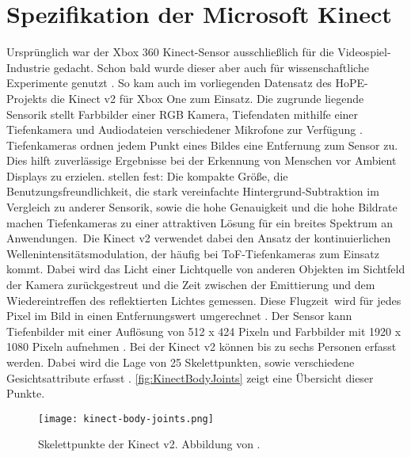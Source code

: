 \section{Spezifikation der Microsoft Kinect}
\label{2-SpezifikationKinect}
Ursprünglich war der Xbox 360 Kinect-Sensor ausschließlich für die Videospiel-Industrie gedacht.
Schon bald wurde dieser aber auch für wissenschaftliche Experimente genutzt \citep{tolgyessy_evaluation_2021}.
So kam auch im vorliegenden Datensatz des HoPE-Projekts die Kinect v2 für Xbox One zum Einsatz.
Die zugrunde liegende Sensorik stellt Farbbilder einer \ac{RGB} Kamera, Tiefendaten mithilfe einer Tiefenkamera
und Audiodateien verschiedener Mikrofone zur Verfügung \citep{windows-developer-center_microsoft_corporation_human_2014}.
Tiefenkameras ordnen jedem Punkt eines Bildes eine Entfernung zum Sensor zu.
Dies hilft zuverlässige Ergebnisse bei der Erkennung von Menschen vor Ambient Displays zu erzielen.
\citet{li_time-flight_2014} stellen fest:
\glqq Die kompakte Größe, die Benutzungsfreundlichkeit,
die stark vereinfachte Hintergrund-Subtraktion im Vergleich zu anderer Sensorik, sowie die hohe Genauigkeit
und die hohe Bildrate machen Tiefenkameras zu einer attraktiven Lösung für ein breites Spektrum an Anwendungen.\grqq\
Die Kinect v2 verwendet dabei den Ansatz der kontinuierlichen Wellenintensitätsmodulation,
der häufig bei \ac{ToF}-Tiefenkameras zum Einsatz kommt.
Dabei wird das Licht einer Lichtquelle von anderen Objekten im Sichtfeld der Kamera zurückgestreut
und die Zeit zwischen der Emittierung und dem Wiedereintreffen des reflektierten Lichtes gemessen.
Diese \glqq Flugzeit\grqq\ wird für jedes Pixel im Bild in einen Entfernungswert umgerechnet \citep{tolgyessy_evaluation_2021}.
Der Sensor kann Tiefenbilder mit einer Auflösung von 512 x 424 Pixeln
und Farbbilder mit 1920 x 1080 Pixeln aufnehmen \citep{marin_multi-camera_2019}.
Bei der Kinect v2 können bis zu sechs Personen erfasst werden.
Dabei wird die Lage von 25 Skelettpunkten, sowie verschiedene Gesichtsattribute erfasst \citep{windows-developer-center_microsoft_corporation_human_2014}.
\autoref{fig:KinectBodyJoints} zeigt eine Übersicht dieser Punkte. 
\begin{figure}[ht]
  \begin{center}
  \texttt{[image: kinect-body-joints.png]}
  \end{center}
  \caption{Skelettpunkte der Kinect v2. Abbildung von \citet{windows-developer-center_microsoft_corporation_human_2014}.}
  \label{fig:KinectBodyJoints}
\end{figure}

